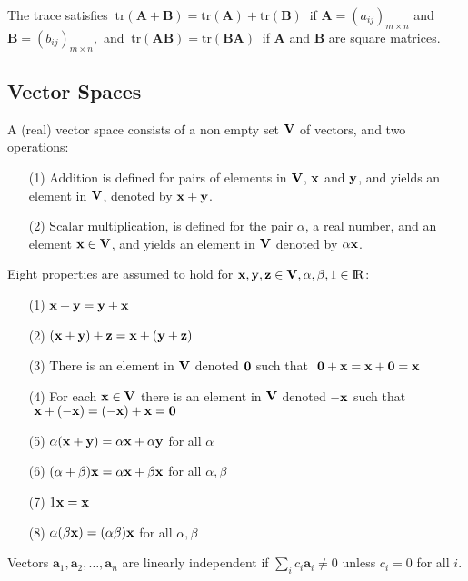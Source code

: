 \bstheo
The trace satisfies $\ \mathbf{\mathrm{tr}(A + B) = \mathrm{tr}(A) +
\mathrm{tr}(B)}\ $ if $\mathbf{A}=(a_{ij})_{m\times n}$ and
$\mathbf{B}=(b_{ij})_{m\times n},$ and $\ \mathbf{\mathrm{tr}(AB) =
\mathrm{tr}(BA)}\ $ if $\mathbf A$ and $\mathbf B$ are square
matrices.
\etheo



\subsection{Vector Spaces}

\bdefi
A (real) vector space consists of a non empty set ${\bf V}$ of
vectors, and two operations:
\begin{enumerate}
\item[(1)] 
Addition is defined for pairs of elements in ${\bf V}$, ${\bf x}$ and
${\bf y}$, and yields an element in ${\bf V}$, denoted by ${\bf x} +
{\bf y}$.
\item[(2)] 
Scalar multiplication, is defined for the pair $\alpha$, a real
number, and an element ${\bf x} \in {\bf V}$, and yields an element in
${\bf V}$ denoted by $\alpha{\bf x}$.
\end{enumerate}
Eight properties are assumed to hold for ${\bf x}, {\bf y}, {\bf z}
\in {\bf V}, \alpha ,\beta, 1 \in {\rm I\!R}$:
\begin{enumerate}
\item[(1)] 
${\bf x} + {\bf y} = {\bf y} + {\bf x}$
\item[(2)] 
$({\bf x} + {\bf y})+{\bf z} = {\bf x}+({\bf y} + {\bf z})$
\item[(3)] 
There is an element in ${\bf V}$ denoted ${\bf 0}$ such that
$\ {\bf 0} + {\bf x} = {\bf x} + {\bf 0} = {\bf x}$
\item[(4)] 
For each ${\bf x} \in {\bf V}$ there is an element in ${\bf V}$
denoted $-{\bf x}$ such that
$\ {\bf x} + (-{\bf x}) = (-{\bf x}) + {\bf x} = {\bf 0}$
\item[(5)] 
$\alpha({\bf x} + {\bf y}) = \alpha{\bf x}+ \alpha{\bf y}$ for all
$\alpha$
\item[(6)] 
$(\alpha+\beta){\bf x}=\alpha{\bf x}+\beta{\bf x}$ for all $\alpha,
\beta$
\item[(7)] 
$ 1{\bf x} = {\bf x}$
\item[(8)] 
$\alpha(\beta{\bf x})=(\alpha\beta){\bf x}$ for all $\alpha, \beta$
\end{enumerate}
\esdefi

\bdefi
Vectors $\mathbf{a}_1, \mathbf{a}_2, \ldots,\mathbf{a}_n$ are linearly
independent if $\sum_i c_i \mathbf a_i \neq 0$ unless $c_i=0$ for all
$i$.
\esdefi

